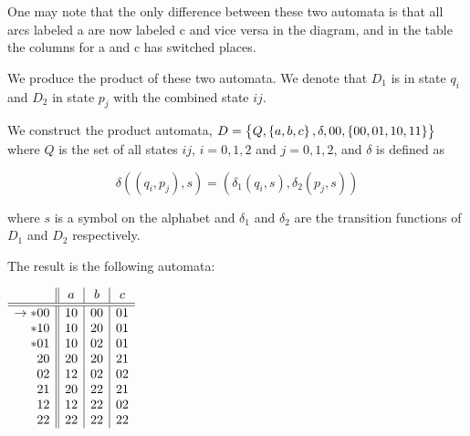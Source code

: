 \documentclass{article}
\begin{document}
\begin{enumerate}
        One may note that the only difference between these two automata is that all arcs labeled a are now labeled c and vice versa in the diagram, and in the table the columns for a and c has switched places.

        We produce the product of these two automata. We denote that $D_1$ is in state $q_i$ and $D_2$ in state $p_j$ with the combined state $ij$.

        We construct the product automata, $D = \set{Q, \set{a,b,c}, \delta, 00, \set{00,01,10,11}}$ where $Q$ is the set of all states $ij$, $i=0,1,2$  and $j = 0, 1, 2$, and $\delta$ is defined as

        $$\delta((q_i,p_j), s) = (\delta_1(q_i, s), \delta_2(p_j, s))$$

        where $s$ is a symbol on the alphabet and $\delta_1$ and $\delta_2$ are the transition functions of $D_1$ and $D_2$ respectively.

        The result is the following automata:

        $
        \begin{array}{r || c | c | c}
                & a & b & c \\ \hline \hline
            \to *00 & 10 & 00 & 01 \\
            *10 & 10 & 20 & 01 \\
            * 01 & 10 & 02 & 01 \\
            20 & 20 & 20 & 21 \\
            02 & 12 & 02 & 02 \\
            21 & 20 & 22 & 21 \\
            12 & 12 & 22 & 02 \\
            22 & 22 & 22 & 22
        \end{array}
        $

\end{enumerate}
\end{document}
